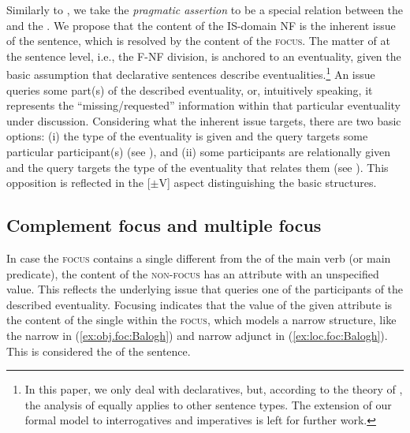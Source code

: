 \documentclass[output=paper,colorlinks,citecolor=brown]{langscibook}
\begin{document}
Similarly to \citet{lambrecht:94}, we take the \textit{pragmatic assertion} to be a special relation between the  and the . We propose that the  content of the IS-domain NF is the inherent issue of the sentence, which is resolved by the content of the {\textsc{focus}}. The matter of  at the sentence level, i.e., the F-NF division, is anchored to an eventuality, given the basic assumption that declarative sentences describe eventualities.\footnote{In this paper, we only deal with declaratives, but, according to the theory of , the analysis of  equally applies to other sentence types. The extension of our formal model to interrogatives and imperatives is left for further work.} An issue queries some part(s) of the described eventuality, or, intuitively speaking, it represents the ``missing/requested'' information within that particular eventuality under discussion. Considering what the inherent issue targets, there are two basic options: (i) the type of the eventuality is given and the query targets some particular participant(s) (see ), and (ii) some participants are relationally given and the query targets the type of the eventuality that relates them (see ). This opposition is reflected in the [$\pm$V] aspect distinguishing the basic  structures. 

\subsection{Complement focus and multiple focus}\label{sec:compl.foc:Balogh}

In case the {\textsc{focus}} contains a single  different from the  of the main verb (or main predicate), the content of the {\textsc{non-focus}} has an attribute with an unspecified value. This reflects the underlying issue that queries one of the participants of the described eventuality. Focusing indicates that the value of the given attribute is the content of the single  within the {\textsc{focus}}, which models a narrow  structure, like the narrow   in (\ref{ex:obj.foc:Balogh}) and narrow adjunct  in (\ref{ex:loc.foc:Balogh}). This is considered the  of the sentence.  
\end{document}
